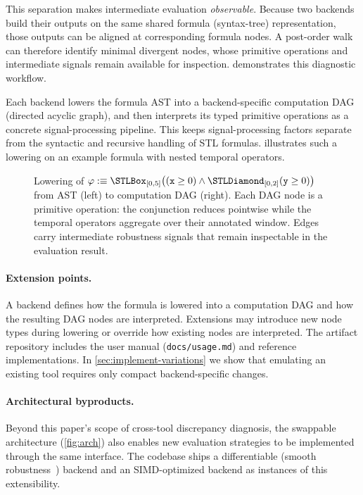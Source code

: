This separation makes intermediate evaluation \emph{observable}. Because two
backends build their outputs on the same shared formula (syntax-tree)
representation, those outputs can be aligned at corresponding formula nodes.
A post-order walk can therefore identify minimal divergent nodes, whose
primitive operations and intermediate signals remain available for inspection.
 demonstrates this diagnostic workflow.

Each backend lowers the formula AST into a backend-specific computation DAG (directed acyclic graph),
and then interprets its typed primitive operations as a concrete signal-processing
pipeline. This keeps signal-processing factors separate from the syntactic
and recursive handling of STL formulas.
 illustrates
such a lowering on an example formula with nested temporal operators.

\begin{figure}[t]
\centering
\scalebox{0.85}{}
\caption{
Lowering of $\varphi :\equiv \Always_{[0,5]}\bigl((\mathtt{x} \ge 0) \wedge
\Eventually_{[0,2]}(\mathtt{y} \ge 0)\bigr)$ from AST (left) to computation DAG (right).
Each DAG node is a primitive operation: the conjunction reduces pointwise while the
temporal operators aggregate over their annotated window. Edges carry
intermediate robustness signals that remain inspectable in the evaluation result.
}
\label{fig:inspectable-dag}
\end{figure}

\paragraph{Extension points.}

A backend defines how the formula is lowered into a computation DAG and how
the resulting DAG nodes are interpreted. Extensions may introduce new node
types during lowering or override how existing nodes are interpreted.
The artifact repository includes the user manual (\texttt{docs/usage.md}) and
reference implementations. In \cref{sec:implement-variations} we show that
emulating an existing tool requires only compact backend-specific changes.

\paragraph{Architectural byproducts.}
Beyond this paper's scope of cross-tool discrepancy diagnosis,
the swappable architecture (\cref{fig:arch}) also enables new evaluation strategies to be implemented
through the same interface. The codebase ships a differentiable
(smooth robustness~\cite{kapoor2025stlcgpp}) backend and an SIMD-optimized backend as
instances of this extensibility.


